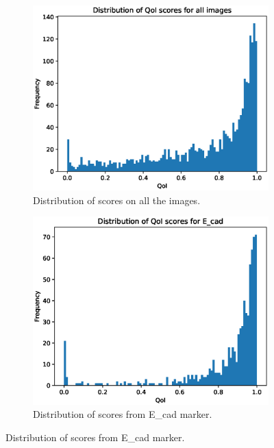 \begin{figure}[ht!]
\centering
\begin{subfigure}{.5\textwidth}
  \centering
  \includegraphics[scale=0.37]{img/SPIE/all_probs_smote_pca.eps}
  \caption{Distribution of scores on all the images.}
  \label{fig:all_probs}
\end{subfigure}%
\begin{subfigure}{.5\textwidth}
  \centering
  \includegraphics[scale=0.37]{img/SPIE/E_cad_probs_smote_pca.eps}
  \caption{Distribution of scores from E\_cad marker.}
  \label{fig:ecad_probs}
\end{subfigure}

\end{figure}
